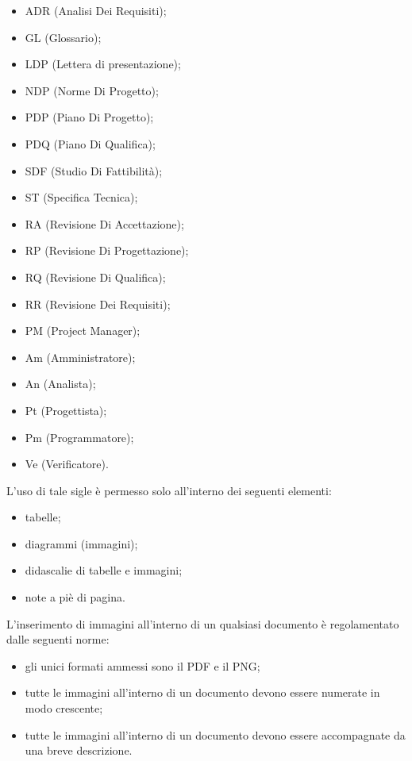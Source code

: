 						\begin{itemize}
							\item ADR (Analisi Dei Requisiti);
							\item GL (Glossario);
							\item LDP (Lettera di presentazione);
							\item NDP (Norme Di Progetto);
							\item PDP (Piano Di Progetto);
							\item PDQ (Piano Di Qualifica);
							\item SDF (Studio Di Fattibilità);
							\item ST (Specifica Tecnica);
							\item RA (Revisione Di Accettazione);
							\item RP (Revisione Di Progettazione);
							\item RQ (Revisione Di Qualifica);
							\item RR (Revisione Dei Requisiti);
							\item PM (Project Manager);
							\item Am (Amministratore);
							\item An (Analista);
							\item Pt (Progettista);
							\item Pm (Programmatore);
							\item Ve (Verificatore).
						\end{itemize}
						L’uso di tale sigle è permesso solo all’interno dei seguenti elementi:
						\begin{itemize}
							\item tabelle;
							\item diagrammi (immagini);
							\item didascalie di tabelle e immagini;
							\item note a piè di pagina.
						\end{itemize}
					L’inserimento di immagini all’interno di un qualsiasi documento è regolamentato dalle seguenti norme:
					\begin{itemize}
						\item gli unici formati ammessi sono il PDF e il PNG;
						\item tutte le immagini all’interno di un documento devono essere numerate in modo crescente;
						\item tutte le immagini all’interno di un documento devono essere accompagnate da una breve descrizione.
					\end{itemize}
